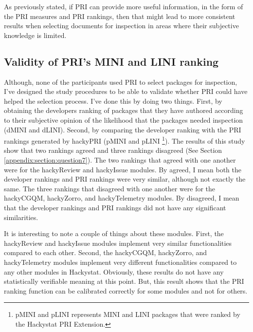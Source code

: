 As previously stated, if PRI can provide more useful information, in the
form of the PRI measures and PRI rankings, then that might lead to more
consistent results when selecting documents for inspection in areas where
their subjective knowledge is limited.


\subsection{Validity of PRI's MINI and LINI ranking}
Although, none of the participants used PRI to select packages for
inspection, I've designed the study procedures to be able to validate
whether PRI could have helped the selection process. I've done this by
doing two things. First, by obtaining the developers ranking of packages
that they have authored according to their subjective opinion of the
likelihood that the packages needed inspection (dMINI and dLINI). Second,
by comparing the developer ranking with the PRI rankings generated by
hackyPRI (pMINI and pLINI \footnote{pMINI and pLINI represents MINI and
  LINI packages that were ranked by the Hackystat PRI Extension.}). The
results of this study show that two rankings agreed and three rankings
disagreed (See Section \ref{appendix:section:question7}). The two rankings
that agreed with one another were for the hackyReview and hackyIssue
modules. By agreed, I mean both the developer rankings and PRI rankings
were very similar, although not exactly the same. The three rankings that
disagreed with one another were for the hackyCGQM, hackyZorro, and
hackyTelemetry modules. By disagreed, I mean that the developer rankings
and PRI rankings did not have any significant similarities.

It is interesting to note a couple of things about these modules. First,
the hackyReview and hackyIssue modules implement very similar
functionalities compared to each other. Second, the hackyCGQM, hackyZorro,
and hackyTelemetry modules implement very different functionalities
compared to any other modules in Hackystat. Obviously, these results do not
have any statistically verifiable meaning at this point. But, this result
shows that the PRI ranking function can be calibrated correctly for some
modules and not for others. 


